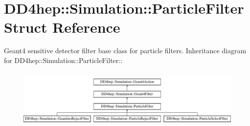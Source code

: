 \hypertarget{struct_d_d4hep_1_1_simulation_1_1_particle_filter}{
\section{DD4hep::Simulation::ParticleFilter Struct Reference}
\label{struct_d_d4hep_1_1_simulation_1_1_particle_filter}
}


Geant4 sensitive detector filter base class for particle filters.  
Inheritance diagram for DD4hep::Simulation::ParticleFilter::\begin{figure}[H]
\begin{center}
\leavevmode
\includegraphics[height=2.99866cm]{struct_d_d4hep_1_1_simulation_1_1_particle_filter}
\end{center}
\end{figure}
